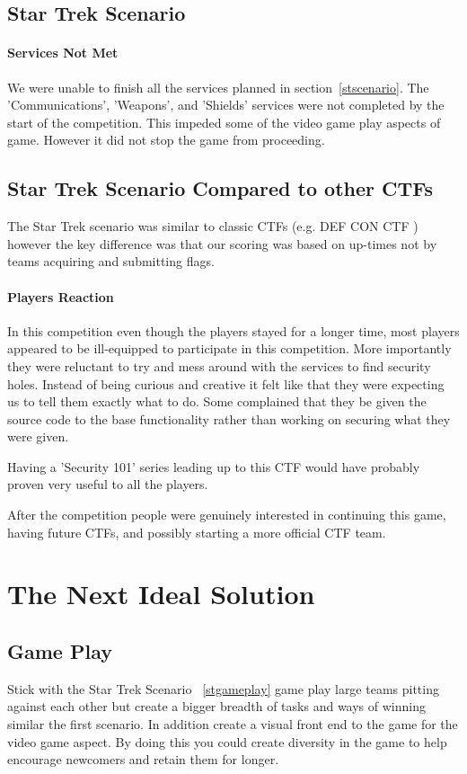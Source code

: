 \documentclass[10pt]{article}
\begin{document}
\subsection{Star Trek Scenario}

\paragraph*{Services Not Met}
We were unable to finish all the services planned in section~\ref{stscenario}.
The 'Communications', 'Weapons', and 'Shields' services were not completed by
the start of the competition. This impeded some of the video game play aspects of game. 
However it did not stop the game from proceeding.

\subsection{Star Trek Scenario Compared to other CTFs}
The Star Trek scenario was similar to classic CTFs (e.g. DEF CON CTF \cite{DEFCONCTF}) 
however the key difference was that our scoring was based on up-times not by teams 
acquiring and submitting flags.

\paragraph*{Players Reaction}
In this competition even though the players stayed for a longer time, most 
players appeared to be ill-equipped to participate in this competition. More
importantly they were reluctant to try and mess around with the services to
find security holes. Instead of being curious and creative it felt like that
they were expecting us to tell them exactly what to do. Some complained that
they be given the source code to the base functionality rather than
working on securing what they were given.

Having a 'Security 101' series leading up to this CTF would have probably
proven very useful to all the players.

After the competition people were genuinely interested in continuing this game,
having future CTFs, and possibly starting a more official CTF team.

\section{The Next Ideal Solution}

\subsection{Game Play}
Stick with the Star Trek Scenario ~\ref{stgameplay} game play large teams
pitting against each other but create a bigger breadth of tasks and ways of
winning similar the first scenario. In addition create a visual front end to
the game for the video game aspect. By doing this you could create diversity in
the game to help encourage newcomers and retain them for longer.
\end{document}
